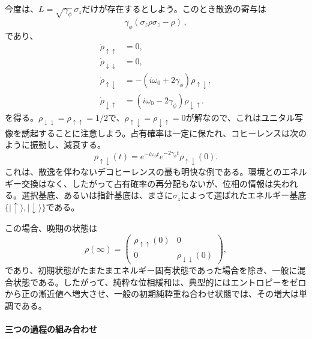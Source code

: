 \documentclass[a4paper,11pt,oneside]{article}
\theoremstyle{definition}
\numberwithin{equation}{section}
\begin{document}
今度は、$ L=\sqrt{\gamma_\phi}\,\sigma_z  $だけが存在するとしよう。このとき散逸の寄与は
\begin{equation}
\gamma_\phi(\sigma_z\rho\sigma_z-\rho) \,,
\end{equation}
であり、
\begin{align}
\dot\rho_{\uparrow\uparrow} &= 0 ,
\\
\dot\rho_{\downarrow\downarrow} &= 0 ,
\\
\dot\rho_{\uparrow\downarrow}
&=
-\left(i\omega_0+2\gamma_\phi\right)\rho_{\uparrow\downarrow} ,
\\
\dot\rho_{\downarrow\uparrow}
&=
\left(i\omega_0-2\gamma_\phi\right)\rho_{\downarrow\uparrow} .
\end{align}
を得る。$ \rho_{\downarrow\downarrow}=\rho_{\uparrow\uparrow} =1/2$で、$ \rho_{\uparrow\downarrow}=\rho_{\downarrow\uparrow} =0$が解なので、これはユニタル写像を誘起することに注意しよう。占有確率は一定に保たれ、コヒーレンスは次のように振動し、減衰する。
\begin{equation}
\rho_{\uparrow\downarrow}(t)
=
e^{-i\omega_0 t}e^{-2\gamma_\phi t}\rho_{\uparrow\downarrow}(0) .
\end{equation}
これは、散逸を伴わないデコヒーレンスの最も明快な例である。環境とのエネルギー交換はなく、したがって占有確率の再分配もないが、位相の情報は失われる。選択基底、あるいは指針基底は、まさに$\sigma_z$によって選ばれたエネルギー基底$\{|\uparrow\rangle,|\downarrow\rangle\}$である。



この場合、晩期の状態は
\begin{equation}
\rho(\infty)
=
\begin{pmatrix}
\rho_{\uparrow\uparrow}(0) & 0 \\
0 & \rho_{\downarrow\downarrow}(0)
\end{pmatrix},
\end{equation}
であり、初期状態がたまたまエネルギー固有状態であった場合を除き、一般に混合状態である。したがって、純粋な位相緩和は、典型的にはエントロピーをゼロから正の漸近値へ増大させ、一般の初期純粋重ね合わせ状態では、その増大は単調である。



\paragraph{三つの過程の組み合わせ}
\end{document}
